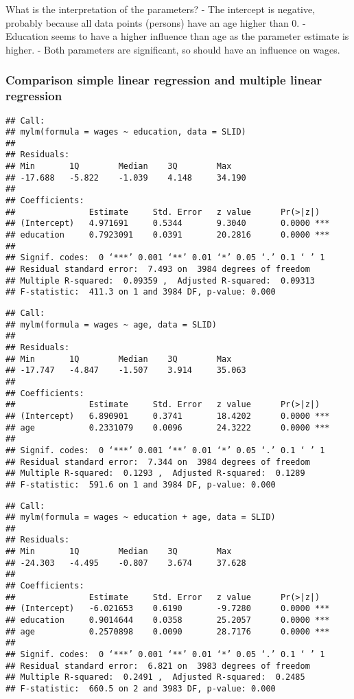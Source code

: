 \documentclass[
]{article}
\begin{document}
What is the interpretation of the parameters? - The intercept is
negative, probably because all data points (persons) have an age higher
than 0. - Education seems to have a higher influence than age as the
parameter estimate is higher. - Both parameters are significant, so
should have an influence on wages.

\hypertarget{comparison-simple-linear-regression-and-multiple-linear-regression}{%
\subsubsection{Comparison simple linear regression and multiple linear
regression}\label{comparison-simple-linear-regression-and-multiple-linear-regression}}

\begin{verbatim}
## Call:
## mylm(formula = wages ~ education, data = SLID)
## 
## Residuals:
## Min       1Q        Median    3Q        Max       
## -17.688   -5.822    -1.039    4.148     34.190    
## 
## Coefficients:
##               Estimate     Std. Error   z value      Pr(>|z|)     
## (Intercept)   4.971691     0.5344       9.3040       0.0000 ***   
## education     0.7923091    0.0391       20.2816      0.0000 ***   
## 
## Signif. codes:  0 ‘***’ 0.001 ‘**’ 0.01 ‘*’ 0.05 ‘.’ 0.1 ‘ ’ 1
## Residual standard error:  7.493 on  3984 degrees of freedom 
## Multiple R-squared:  0.09359 ,  Adjusted R-squared:  0.09313 
## F-statistic:  411.3 on 1 and 3984 DF, p-value: 0.000
\end{verbatim}

\begin{verbatim}
## Call:
## mylm(formula = wages ~ age, data = SLID)
## 
## Residuals:
## Min       1Q        Median    3Q        Max       
## -17.747   -4.847    -1.507    3.914     35.063    
## 
## Coefficients:
##               Estimate     Std. Error   z value      Pr(>|z|)     
## (Intercept)   6.890901     0.3741       18.4202      0.0000 ***   
## age           0.2331079    0.0096       24.3222      0.0000 ***   
## 
## Signif. codes:  0 ‘***’ 0.001 ‘**’ 0.01 ‘*’ 0.05 ‘.’ 0.1 ‘ ’ 1
## Residual standard error:  7.344 on  3984 degrees of freedom 
## Multiple R-squared:  0.1293 ,  Adjusted R-squared:  0.1289 
## F-statistic:  591.6 on 1 and 3984 DF, p-value: 0.000
\end{verbatim}

\begin{verbatim}
## Call:
## mylm(formula = wages ~ education + age, data = SLID)
## 
## Residuals:
## Min       1Q        Median    3Q        Max       
## -24.303   -4.495    -0.807    3.674     37.628    
## 
## Coefficients:
##               Estimate     Std. Error   z value      Pr(>|z|)     
## (Intercept)   -6.021653    0.6190       -9.7280      0.0000 ***   
## education     0.9014644    0.0358       25.2057      0.0000 ***   
## age           0.2570898    0.0090       28.7176      0.0000 ***   
## 
## Signif. codes:  0 ‘***’ 0.001 ‘**’ 0.01 ‘*’ 0.05 ‘.’ 0.1 ‘ ’ 1
## Residual standard error:  6.821 on  3983 degrees of freedom 
## Multiple R-squared:  0.2491 ,  Adjusted R-squared:  0.2485 
## F-statistic:  660.5 on 2 and 3983 DF, p-value: 0.000
\end{verbatim}
\end{document}
